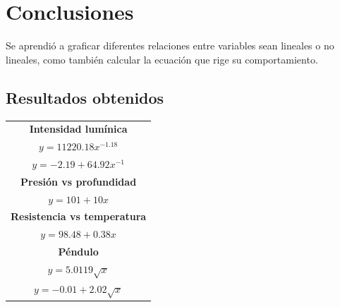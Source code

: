 \documentclass[letter,11pt]{article}
\begin{document}
\section{Conclusiones}
Se aprendió a graficar diferentes relaciones entre variables sean lineales o
no lineales, como también calcular la ecuación que rige su comportamiento.

\subsection{Resultados obtenidos}

\begin{center}
\begin{tabular}{|c|c|}
\hline
\multicolumn{2}{|c|}{\textbf{Intensidad lumínica}} \\
\multicolumn{2}{|c|}{$y = 11220.18 x^{-1.18}$} \\
\multicolumn{2}{|c|}{$y = -2.19 + 64.92 x^{-1}$} \\
\hline
\multicolumn{2}{|c|}{\textbf{Presión vs profundidad}} \\
\multicolumn{2}{|c|}{$y = 101 + 10 x$} \\
\hline
\multicolumn{2}{|c|}{\textbf{Resistencia vs temperatura}} \\
\multicolumn{2}{|c|}{$y = 98.48 + 0.38 x$} \\
\hline
\multicolumn{2}{|c|}{\textbf{Péndulo}} \\
\multicolumn{2}{|c|}{$y = 5.0119 \sqrt{x}$} \\
\multicolumn{2}{|c|}{$y = -0.01 + 2.02 \sqrt{x}$} \\
\hline
\end{tabular}
\end{center}
\end{document}
